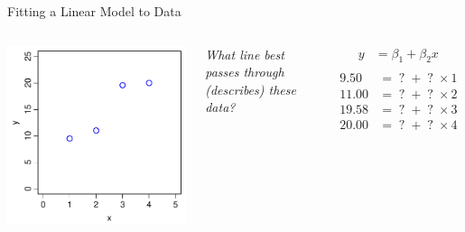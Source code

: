 \documentclass[xcolor=x11names,handout,compress]{beamer}
\renewcommand{\(}{\begin{columns}}
\renewcommand{\)}{\end{columns}}
\newcommand{\<}[1]{\begin{column}{#1}}
\renewcommand{\>}{\end{column}}
\begin{document}
    
\begin{frame}{Fitting a Linear Model to Data}

    \begin{columns}[T]
    
            \includegraphics[width=\textwidth]{Error.pdf}
            
            
        \begin{center}
            {\it What line best passes through (describes) these data?}
           \end{center}
           \pause
           \begin{align*}
              y  &= \beta_1 + \beta_2 x \\
            \end{align*}
            \pause
            \vspace{-40pt}
            \begin{align*}
               9.50  &= \;?\; + \;?\; \times 1 \\
              11.00 &= \;?\; + \;?\; \times 2 \\
              19.58 &= \;?\; + \;?\; \times 3 \\
              20.00 &= \;?\; + \;?\; \times 4   
            \end{align*}
             
    \end{columns}
    \end{frame}
    
\end{document}
